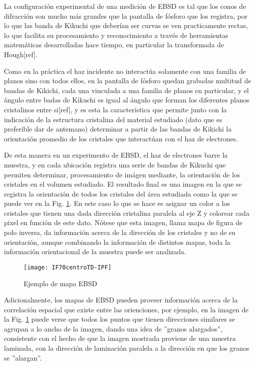 La configuración experimental de una medición de EBSD es tal que los conos de difracción son mucho más grandes que la pantalla de fósforo que los registra, por lo que las banda de Kikuchi que deberían ser curvas se ven practicamente rectas, lo que facilita su procesamiento y reconocimiento a través de herramientas matemáticas desarrolladas hace tiempo, en particular la transformada de Hough[ref].

Como en la práctica el haz incidente no interactúa solamente con una familia de planos sino con todos ellos, en la pantalla de fósforo quedan grabadas multitud de bandas de Kikichi, cada una vinculada a una familia de planos en particular, y el ángulo entre badas de Kikuchi es igual al ángulo que forman los diferentes planos cristalinos entre si[ref], y es esta la característica que permite junto con la indicación de la estructura cristalina del material estudiado (dato que es preferible dar de antemano) determinar a partir de las bandas de Kikichi la orientación promedio de los cristales que interactúan con el haz de electrones.

De esta manera en un experimento de EBSD, el haz de electrones barre la muestra, y en cada ubicación registra una serie de bandas de Kikuchi que permiten determinar, procesamiento de imágen mediante, la orientación de los cristales en el volumen estudiado.
El resultado final es una imagen en la que se registra la orientación de todos los cristales del área estudiada como la que se puede ver en la Fig. \ref{fig:ebsdex}. 
En este caso lo que se hace es asignar un color a los cristales que tienen una dada dirección cristalina paralela al eje Z y colorear cada pixel en función de este dato. 
Nótese que esta imagen, llama mapa de figura de polo inversa, da información acerca de la dirección de los cristales y no de su orientación, aunque combinando la información de distintos mapas, toda la información orientacional de la muestra puede ser analizada.
\begin{figure}[!htb]
  \centering
  \texttt{[image: IF70centroTD-IPF]}
  \caption{Ejemplo de mapa EBSD}
  \label{fig:ebsdex}
\end{figure}

Adicionalmente, los mapas de EBSD pueden proveer información acerca de la correlación espacial que existe entre las orienciones, por ejemplo, en la imagen de la Fig. \ref{fig:ebsdex} puede verse que todos los puntos que tienen direcciones similares se agrupan a lo ancho de la imagen, dando una idea de ''granos alargados'', consistente con el hecho de que la imagen mostrada proviene de una muestra laminada, con la dirección de laminación paralela a la dirección en que los granos se ''alargan''.

